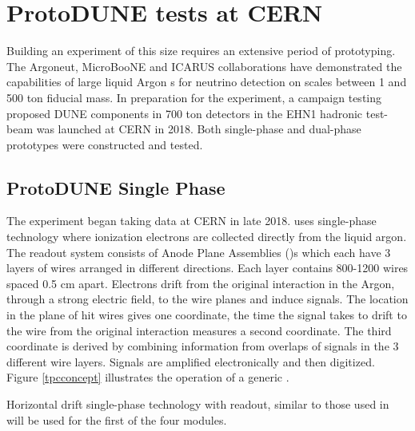 \documentclass[../main-v1.tex]{subfiles}
\begin{document}
\section{ProtoDUNE tests at CERN }

Building an experiment of this size requires an extensive period of prototyping.   The Argoneut\cite{Acciarri:2018myr}, MicroBooNE\cite{microboone} and ICARUS\cite{icarus} collaborations have demonstrated the capabilities of large liquid Argon s for neutrino detection on scales between 1 and 500 ton fiducial mass.  In preparation for the  experiment, a campaign testing proposed DUNE components in 700 ton detectors in the EHN1 hadronic test-beam was launched at CERN in 2018.  Both single-phase and dual-phase prototypes were constructed and tested. %

\subsection{ProtoDUNE Single Phase}
The  experiment began taking data at CERN in late 2018.   uses single-phase technology where ionization electrons are collected directly from the liquid argon. The readout system consists of  Anode Plane Assemblies ()s which each have 3 layers of wires arranged in different directions. Each layer contains 800-1200  wires spaced 0.5 cm apart. Electrons drift from the original interaction in the Argon, through a strong electric field, to the wire planes and induce signals.  The location in the plane of hit wires gives one coordinate, the time the signal takes to drift to the wire from the original interaction measures a second coordinate.  The third coordinate is derived by combining information from overlaps of signals in the 3 different wire layers.  Signals are amplified electronically and then digitized.  Figure \ref{tpcconcept} illustrates the operation of a generic .

Horizontal drift single-phase technology with  readout, similar to those used in   will be used for the first of the four  modules. 
\end{document}
